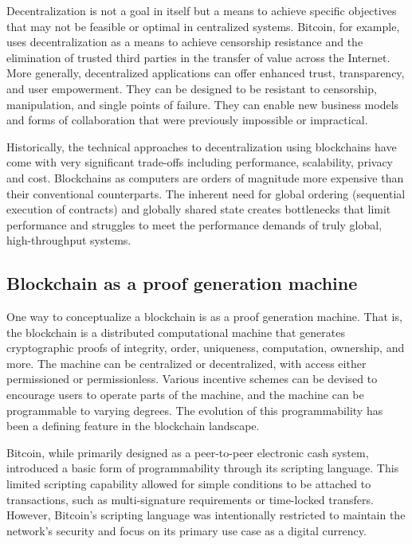 \documentclass{article}
\begin{document}
Decentralization is not a goal in itself but a means to achieve specific objectives that may not be feasible or optimal in centralized systems. Bitcoin, for example, uses decentralization as a means to achieve censorship resistance and the elimination of trusted third parties in the transfer of value across the Internet. More generally, decentralized applications can offer enhanced trust, transparency, and user empowerment. They can be designed to be resistant to censorship, manipulation, and single points of failure. They can enable new business models and forms of collaboration that were previously impossible or impractical.

Historically, the technical approaches to decentralization using blockchains have come with very significant trade-offs including performance, scalability, privacy and cost. Blockchains as computers are orders of magnitude more expensive than their conventional counterparts. The inherent need for global ordering (sequential execution of contracts) and globally shared state creates bottlenecks that limit performance and struggles to meet the performance demands of truly global, high-throughput systems.

\subsection*{Blockchain as a proof generation machine}

One way to conceptualize a blockchain is as a proof generation machine. That is, the blockchain is a distributed computational machine that generates cryptographic proofs of integrity, order, uniqueness, computation, ownership, and more. The machine can be centralized or decentralized, with access either permissioned or permissionless. Various incentive schemes can be devised to encourage users to operate parts of the machine, and the machine can be programmable to varying degrees. The evolution of this programmability has been a defining feature in the blockchain landscape.

Bitcoin, while primarily designed as a peer-to-peer electronic cash system, introduced a basic form of programmability through its scripting language. This limited scripting capability allowed for simple conditions to be attached to transactions, such as multi-signature requirements or time-locked transfers. However, Bitcoin's scripting language was intentionally restricted to maintain the network's security and focus on its primary use case as a digital currency.
\end{document}

